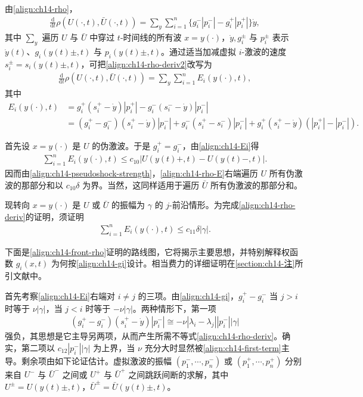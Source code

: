 \documentclass[../../main.tex]{subfiles}
\begin{document}
由\eqref{align:ch14-rho}，
\begin{align}
\frac{\mathrm{d}}{\mathrm{d}t}\rho(U(\cdot,t),\bar U(\cdot,t))=\sum_y\sum_{i=1}^n\{g_i^-|p_i^-|-g_i^+|p_i^+|\}\dot y,
\label{align:ch14-rho-deriv2}
\end{align}
其中 $\sum_y$ 遍历 $U$ 与 $\bar U$ 中穿过 $t$-时间线的所有波 $x=y(\cdot)$，$\dot y,g_i^\pm$ 与 $p_i^\pm$ 表示 $\dot y(t)$、$g_i(y(t)\pm,t)$ 与 $p_i(y(t)\pm,t)$。通过适当加减虚拟 $i$-激波的速度 $s_i^\pm=s_i(y(t)\pm,t)$，可把\eqref{align:ch14-rho-deriv2}改写为
\begin{align}
\frac{\mathrm{d}}{\mathrm{d}t}\rho(U(\cdot,t),\bar U(\cdot,t))=\sum_y\sum_{i=1}^n E_i(y(\cdot),t),
\label{align:ch14-rho-E}
\end{align}
其中
\begin{align}
E_i(y(\cdot),t)&=g_i^+(s_i^+-\dot y)|p_i^+|-g_i^-(s_i^--\dot y)|p_i^-|\nonumber\\
&=(g_i^+-g_i^-)(s_i^+-\dot y)|p_i^-|+g_i^-(s_i^+-s_i^-)|p_i^-|+g_i^+(s_i^+-\dot y)(|p_i^+|-|p_i^-|).
\label{align:ch14-Ei}
\end{align}

首先设 $x=y(\cdot)$ 是 $U$ 的伪激波。于是 $g_i^+=g_i^-$，由\eqref{align:ch14-Ei}得
\begin{align}
\sum_{i=1}^n E_i(y(\cdot),t)\leqslant c_{10}|U(y(t)+,t)-U(y(t)-,t)|.
\label{align:ch14-pseudo-rho}
\end{align}
因而由\eqref{align:ch14-pseudoshock-strength}，\eqref{align:ch14-rho-E}右端遍历 $U$ 所有伪激波的那部分和以 $c_{10}\delta$ 为界。当然，这同样适用于遍历 $\bar U$ 所有伪激波的那部分和。

现转向 $x=y(\cdot)$ 是 $U$ 或 $\bar U$ 的振幅为 $\gamma$ 的 $j$-前沿情形。为完成\eqref{align:ch14-rho-deriv}的证明，须证明
\begin{align}
\sum_{i=1}^n E_i(y(\cdot),t)\leqslant c_{11}\delta|\gamma|.
\label{align:ch14-front-rho}
\end{align}

下面是\eqref{align:ch14-front-rho}证明的路线图，它将揭示主要思想，并特别解释权函数 $g_i(x,t)$ 为何按\eqref{align:ch14-gi}设计。相当费力的详细证明在\cref{section:ch14-注}所引文献中。

首先考察\eqref{align:ch14-Ei}右端对 $i\neq j$ 的三项。由\eqref{align:ch14-gi}，$g_i^+-g_i^-$ 当 $j>i$ 时等于 $\nu|\gamma|$，当 $j<i$ 时等于 $-\nu|\gamma|$。两种情形下，第一项
\begin{align}
(g_i^+-g_i^-)(s_i^+-\dot y)|p_i^-|\cong-\nu|\lambda_i-\lambda_j||p_i^-||\gamma|
\label{align:ch14-first-term}
\end{align}
强负，其思想是它主导另两项，从而产生所需不等式\eqref{align:ch14-rho-deriv}。确实，第二项以 $c_{12}|p_i^-||\gamma|$ 为上界，当 $\nu$ 充分大时显然被\eqref{align:ch14-first-term}主导。剩余项由如下论证估计。虚拟激波的振幅 $(p_1^-,\cdots,p_n^-)$ 或 $(p_1^+,\cdots,p_n^+)$ 分别来自 $U^-$ 与 $\bar U^-$ 之间或 $U^+$ 与 $\bar U^+$ 之间跳跃间断的求解，其中 $U^\pm=U(y(t)\pm,t)$，$\bar U^\pm=\bar U(y(t)\pm,t)$。
\end{document}
